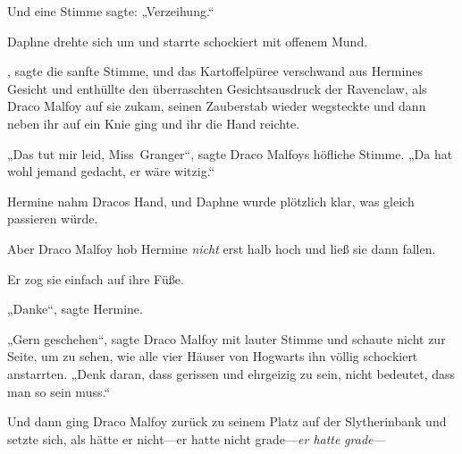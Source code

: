 Und eine Stimme sagte: „Verzeihung.“

Daphne drehte sich um und starrte schockiert mit offenem Mund.

, sagte die sanfte Stimme, und das Kartoffelpüree verschwand aus Hermines Gesicht und enthüllte den überraschten Gesichtsausdruck der Ravenclaw, als Draco Malfoy auf sie zukam, seinen Zauberstab wieder wegsteckte und dann neben ihr auf ein Knie ging und ihr die Hand reichte.

„Das tut mir leid, Miss~Granger“, sagte Draco Malfoys höfliche Stimme. „Da hat wohl jemand gedacht, er wäre witzig.“

Hermine nahm Dracos Hand, und Daphne wurde plötzlich klar, was gleich passieren würde.

Aber Draco Malfoy hob Hermine \emph{nicht} erst halb hoch und ließ sie dann fallen.

Er zog sie einfach auf ihre Füße.

„Danke“, sagte Hermine.

„Gern geschehen“, sagte Draco Malfoy mit lauter Stimme und schaute nicht zur Seite, um zu sehen, wie alle vier Häuser von Hogwarts ihn völlig schockiert anstarrten. „Denk daran, dass gerissen und ehrgeizig zu sein, nicht bedeutet, dass man so sein muss.“

Und dann ging Draco Malfoy zurück zu seinem Platz auf der Slytherinbank und setzte sich, als hätte er nicht—er hatte nicht grade—\emph{er hatte} \emph{grade}—


